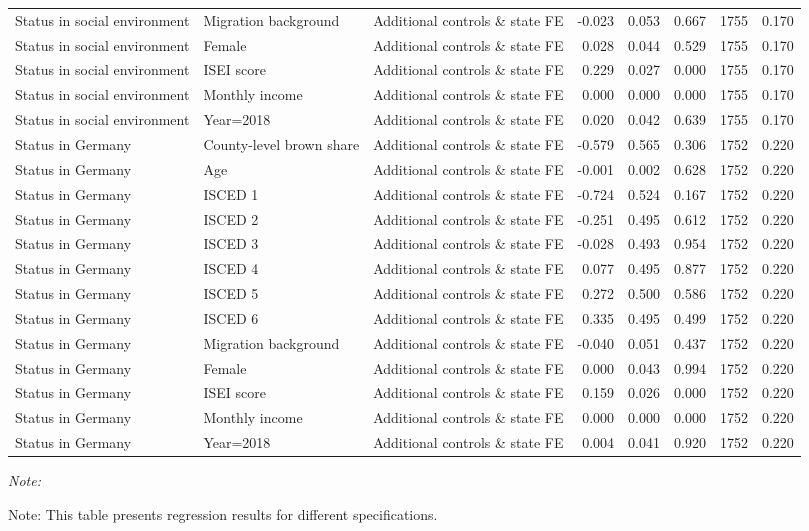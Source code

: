 \begin{table}
{\begin{threeparttable}
\begin{tabular}[t]{lllrrrrr}
Status in social environment & Migration background & Additional controls \& state FE & -0.023 & 0.053 & 0.667 & 1755 & 0.170\\
Status in social environment & Female & Additional controls \& state FE & 0.028 & 0.044 & 0.529 & 1755 & 0.170\\
Status in social environment & ISEI score & Additional controls \& state FE & 0.229 & 0.027 & 0.000 & 1755 & 0.170\\
Status in social environment & Monthly income & Additional controls \& state FE & 0.000 & 0.000 & 0.000 & 1755 & 0.170\\
Status in social environment & Year=2018 & Additional controls \& state FE & 0.020 & 0.042 & 0.639 & 1755 & 0.170\\
Status in Germany & County-level brown share & Additional controls \& state FE & -0.579 & 0.565 & 0.306 & 1752 & 0.220\\
Status in Germany & Age & Additional controls \& state FE & -0.001 & 0.002 & 0.628 & 1752 & 0.220\\
Status in Germany & ISCED 1 & Additional controls \& state FE & -0.724 & 0.524 & 0.167 & 1752 & 0.220\\
Status in Germany & ISCED 2 & Additional controls \& state FE & -0.251 & 0.495 & 0.612 & 1752 & 0.220\\
Status in Germany & ISCED 3 & Additional controls \& state FE & -0.028 & 0.493 & 0.954 & 1752 & 0.220\\
Status in Germany & ISCED 4 & Additional controls \& state FE & 0.077 & 0.495 & 0.877 & 1752 & 0.220\\
Status in Germany & ISCED 5 & Additional controls \& state FE & 0.272 & 0.500 & 0.586 & 1752 & 0.220\\
Status in Germany & ISCED 6 & Additional controls \& state FE & 0.335 & 0.495 & 0.499 & 1752 & 0.220\\
Status in Germany & Migration background & Additional controls \& state FE & -0.040 & 0.051 & 0.437 & 1752 & 0.220\\
Status in Germany & Female & Additional controls \& state FE & 0.000 & 0.043 & 0.994 & 1752 & 0.220\\
Status in Germany & ISEI score & Additional controls \& state FE & 0.159 & 0.026 & 0.000 & 1752 & 0.220\\
Status in Germany & Monthly income & Additional controls \& state FE & 0.000 & 0.000 & 0.000 & 1752 & 0.220\\
Status in Germany & Year=2018 & Additional controls \& state FE & 0.004 & 0.041 & 0.920 & 1752 & 0.220\\
\bottomrule
\end{tabular}
\begin{tablenotes}[para]
\item \textit{Note: } 
\item Note: This table presents regression results for different specifications.
\end{tablenotes}
\end{threeparttable}}
\end{table}
